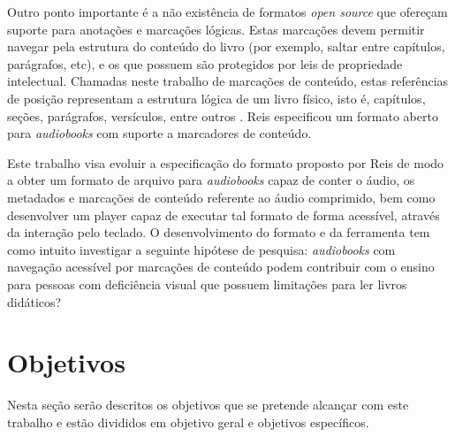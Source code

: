 Outro ponto importante é a não existência de formatos \textit{open source} que ofereçam suporte para anotações e marcações lógicas. Estas marcações devem permitir navegar pela estrutura do conteúdo do livro (por exemplo, saltar entre capítulos, parágrafos, etc), e os que possuem são protegidos por leis de propriedade intelectual. Chamadas neste trabalho de marcações de conteúdo, estas referências de posição representam a estrutura lógica de um livro físico, isto é, capítulos, seções, parágrafos, versículos, entre outros \cite{herbert}. Reis especificou um formato aberto para \textit{audiobooks} com suporte a marcadores de conteúdo.

Este trabalho visa evoluir a especificação do formato proposto por Reis de modo a obter um formato de arquivo para \textit{audiobooks} capaz de conter o áudio, os metadados e marcações de conteúdo referente ao áudio comprimido, bem como desenvolver um player capaz de executar tal formato de forma acessível, através da interação pelo teclado. O desenvolvimento do formato e da ferramenta tem como intuito investigar a seguinte hipótese de pesquisa: \textit{audiobooks} com navegação acessível por marcações de conteúdo podem contribuir com o ensino para pessoas com deficiência visual que possuem limitações para ler livros didáticos?


\section{Objetivos}

Nesta seção serão descritos os objetivos que se pretende alcançar com este trabalho e estão divididos em objetivo geral e objetivos específicos.

